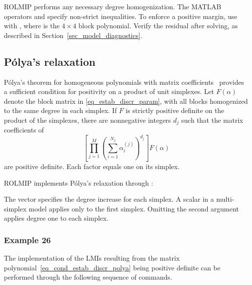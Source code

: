 \documentclass[english,11pt]{article}
\theoremstyle{break} \theorembodyfont{\small\rm}
\begin{document}
ROLMIP performs any necessary degree homogenization.
The MATLAB operators \mcode{>=} and \mcode{<=} specify non-strict
inequalities. To enforce a positive margin, use
 with , where  is the
$4\times4$ block polynomial. Verify the residual after solving, as described
in Section~\ref{sec_model_diagnostics}.


\subsection{P\'{o}lya's relaxation}\label{subsec_polya}
P\'{o}lya's theorem for homogeneous polynomials with matrix
coefficients~\cite{Sch:03,Sch:05,OP:08b} provides a sufficient condition
for positivity on a product of unit simplexes. Let $F(\alpha)$ denote the
block matrix in \eqref{eq_estab_discr_param}, with all blocks homogenized
to the same degree in each simplex. If $F$ is strictly positive definite
on the product of the simplexes, there are nonnegative integers $d_j$
such that the matrix coefficients of
\begin{equation}\label{eq_cond_estab_discr_polya}
 \left[\prod_{j=1}^M
 \left(\sum_{i=1}^{N_j}\alpha_i^{(j)}\right)^{d_j}\right] F(\alpha)
\end{equation}
are positive definite. Each factor equals one on its simplex.

ROLMIP implements P\'{o}lya's relaxation through :

\vspace{0.5cm}%
\noindent\begin{minipage}{\linewidth}
\end{minipage}
\vspace{0.2cm}

The vector  specifies the degree increase for each simplex.
A scalar  in a multi-simplex model applies only to the first
simplex. Omitting the second argument applies degree one to each simplex.

\subsubsection*{Example 26}

The implementation of the LMIs resulting from the matrix polynomial~\eqref{eq_cond_estab_discr_polya} being
positive definite can be performed through the following sequence of commands.
\end{document}
